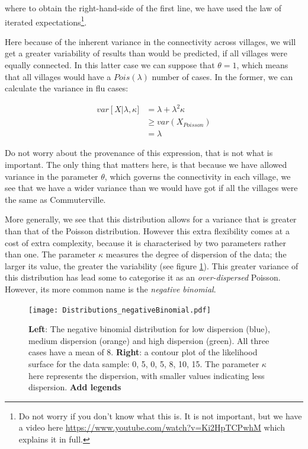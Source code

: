 \documentclass[11pt,fullpage]{book}
\begin{document}
where to obtain the right-hand-side of the first line, we have used the law of iterated expectations\footnote{Do not worry if you don't know what this is. It is not important, but we have a video here \url{https://www.youtube.com/watch?v=Ki2HpTCPwhM} which explains it in full.}. 

Here because of the inherent variance in the connectivity across villages, we will get a greater variability of results than would be predicted, if all villages were equally connected. In this latter case we can suppose that $\theta=1$, which means that all villages would have a $Pois(\lambda)$ number of cases. In the former, we can calculate the variance in flu cases:

\begin{equation}
\begin{align}
var\left[X\right|\lambda,\kappa] &= \lambda + \lambda^2\kappa\\
&\geq var(X_{Poisson})\\
&= \lambda
\end{align}
\end{equation}

Do not worry about the provenance of this expression, that is not what is important. The only thing that matters here, is that because we have allowed variance in the parameter $\theta$, which governs the connectivity in each village, we see that we have a wider variance than we would have got if all the villages were the same as Commuterville.

More generally, we see that this distribution allows for a variance that is greater than that of the Poisson distribution. However this extra flexibility comes at a cost of extra complexity, because it is characterised by two parameters rather than one. The parameter $\kappa$ measures the degree of dispersion of the data; the larger its value, the greater the variability (see figure \ref{fig:Distributions_negativeBinomial}). This greater variance of this distribution has lead some to categorise it as an \textit{over-dispersed} Poisson. However, its more common name is the \textit{negative binomial}.

\begin{figure}
\centering
\scalebox{0.5} 
{\texttt{[image: Distributions\_negativeBinomial.pdf]}}
\caption{\textbf{Left}: The negative binomial distribution for low dispersion (blue), medium dispersion (orange) and high dispersion (green). All three cases have a mean of 8. \textbf{Right}: a contour plot of the likelihood surface for the data sample: {0, 5, 0, 5, 8, 10, 15}. The parameter $\kappa$ here represents the dispersion, with smaller values indicating less dispersion. \textbf{Add legends}}\label{fig:Distributions_negativeBinomial}
\end{figure}
\end{document}
